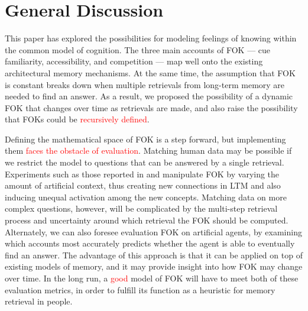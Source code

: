 \documentclass[10pt,letterpaper]{article}
\newcommand{\comment}[1]{}
\newcommand{\fixme}[2][]{#2}
\renewcommand{\fixme}[2][]{\textcolor{red}{#2}}
\newcommand{\textcite}[1]{\citeauthor{#1} \citeyear{#1}}
\begin{document}
\comment{
    mathematical pitfalls
        repeated retrievals will boost activation; 
    the impact of "unrelated" retrievals/inferences
    any modeling issues?
}

\section{General Discussion}

This paper has explored the possibilities for modeling feelings of knowing within the common model of cognition.
The three main accounts of FOK --- cue familiarity, accessibility, and competition --- map well onto the existing architectural memory mechanisms.
At the same time, the assumption that FOK is constant breaks down when multiple retrievals from long-term memory are needed to find an answer.
As a result, we proposed the possibility of a dynamic FOK that changes over time as retrievals are made, and also raise the possibility that FOKs could be \fixme{recursively defined}.

Defining the mathematical space of FOK is a step forward, but implementing them \fixme{faces the obstacle of evaluation}.
Matching human data may be possible if we restrict the model to questions that can be answered by a single retrieval.
Experiments such as those reported in \textcite{Schwartz2014ContextualInformationInfluences} and \textcite{Florer2000FeelingsOfKnowing} manipulate FOK by varying the amount of artificial context, thus creating new connections in LTM and also inducing unequal activation among the new concepts.
Matching data on more complex questions, however, will be complicated by the multi-step retrieval process and uncertainty around which retrieval the FOK should be computed.
Alternately, we can also foresee evaluation FOK on artificial agents, by examining which accounts most accurately predicts whether the agent is able to eventually find an answer.
The advantage of this approach is that it can be applied on top of existing models of memory, and it may provide insight into how FOK may change over time.
In the long run, a \fixme{good} model of FOK will have to meet both of these evaluation metrics, in order to fulfill its function as a heuristic for memory retrieval in people.



\setlength{\bibleftmargin}{.125in}
\setlength{\bibindent}{-\bibleftmargin}


\end{document}
